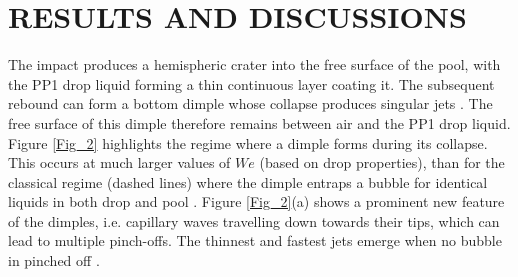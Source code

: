 \documentclass[10pt, a4paper]{article}
\begin{document}

\section{RESULTS AND DISCUSSIONS}
The impact produces a hemispheric crater into the free surface of the pool, 
with the PP1 drop liquid forming a thin continuous layer coating it.
The subsequent rebound can form a bottom dimple whose collapse produces singular jets \cite{Ref7,Ref8}.
The free surface of this dimple therefore remains between air and the PP1 drop liquid.
Figure \ref{Fig_2} highlights the regime where a dimple forms during its collapse.  
This occurs at much larger values of $We$ (based on drop properties), 
than for the classical regime (dashed lines) where the dimple entraps a bubble 
for identical liquids in both drop and pool \cite{Ref9}.
Figure \ref{Fig_2}(a) shows a prominent new feature of the dimples, 
i.e. capillary waves travelling down towards their tips, which can lead to multiple pinch-offs.  
The thinnest and fastest jets emerge when no bubble in pinched off \cite{Ref7}.
\end{document}
